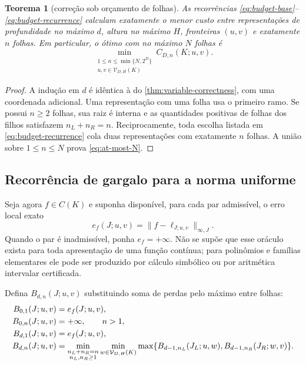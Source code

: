 \documentclass[11pt,a4paper]{article}
\newtheorem{theorem}{Teorema}[section]
\theoremstyle{definition}
\theoremstyle{remark}
\newcommand{\Values}{\mathcal{V}}
\begin{document}
\begin{theorem}[correção sob orçamento de folhas]
\label{thm:leaf-budget}
As recorrências \eqref{eq:budget-base}--\eqref{eq:budget-recurrence}
calculam exatamente o menor custo entre representações de profundidade no
máximo $d$, altura no máximo $H$, fronteiras $(u,v)$ e exatamente $n$
folhas. Em particular, o ótimo com no máximo $N$ folhas é
\begin{equation}
 \min_{\substack{1\le n\le\min\{N,2^D\}\\
                  u,v\in\Values_{D,H}(K)}}
 C_{D,n}(K;u,v).
 \label{eq:at-most-N}
\end{equation}
\end{theorem}

\begin{proof}
A indução em $d$ é idêntica à do
\cref{thm:variable-correctness}, com uma coordenada adicional. Uma
representação com uma folha usa o primeiro ramo. Se possui $n\ge2$ folhas,
sua raiz é interna e as quantidades positivas de folhas dos filhos satisfazem
$n_L+n_R=n$. Reciprocamente, toda escolha listada em
\eqref{eq:budget-recurrence} cola duas representações com exatamente $n$
folhas. A união sobre $1\le n\le N$ prova \eqref{eq:at-most-N}.
\end{proof}

\subsection{Recorrência de gargalo para a norma uniforme}

Seja agora $f\in C(K)$ e suponha disponível, para cada par admissível, o erro
local exato
\begin{equation}
 e_f(J;u,v)=\|f-\ell_{J;u,v}\|_{\infty,J}.
 \label{eq:local-uniform-error}
\end{equation}
Quando o par é inadmissível, ponha $e_f=+\infty$. Não se supõe que esse oráculo
exista para toda apresentação de uma função contínua; para polinômios e
famílias elementares ele pode ser produzido por cálculo simbólico ou por
aritmética intervalar certificada.

Defina $B_{d,n}(J;u,v)$ substituindo soma de perdas pelo máximo entre folhas:
\begin{align}
 B_{0,1}(J;u,v)&=e_f(J;u,v),\label{eq:bottleneck-base}\\
 B_{0,n}(J;u,v)&=+\infty,\qquad n>1,\notag\\
 B_{d,1}(J;u,v)&=e_f(J;u,v),\label{eq:bottleneck-one}\\
 B_{d,n}(J;u,v)
 &=\min_{\substack{n_L+n_R=n\\n_L,n_R\ge1}}
 \min_{w\in\Values_{D,H}(K)}
 \max\{B_{d-1,n_L}(J_L;u,w),
       B_{d-1,n_R}(J_R;w,v)\}.
 \label{eq:bottleneck-recurrence}
\end{align}
\end{document}
